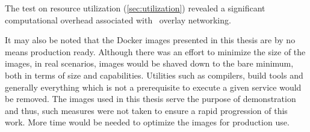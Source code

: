 The test on resource utilization (\cf \autoref{sec:utilization}) revealed a significant computational overhead associated with \wnet\ overlay networking. 

It may also be noted that the Docker images presented in this thesis are by no means production ready. Although there was an effort to minimize the size of the images, in real scenarios, images would be shaved down to the bare minimum, both in terms of size and capabilities. Utilities such as compilers, build tools and generally everything which is not a prerequisite to execute a given service would be removed. The images used in this thesis serve the purpose of demonstration and thus, such measures were not taken to ensure a rapid progression of this work. More time would be needed to optimize the images for production use.

